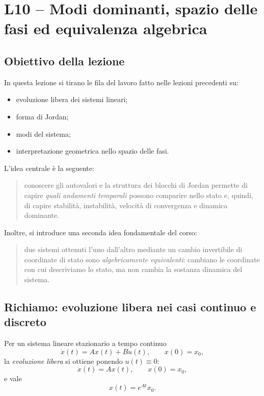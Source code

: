 \chapter{L10 -- Modi dominanti, spazio delle fasi ed equivalenza algebrica}

\section{Obiettivo della lezione}

In questa lezione si tirano le fila del lavoro fatto nelle lezioni precedenti su:
\begin{itemize}
    \item evoluzione libera dei sistemi lineari;
    \item forma di Jordan;
    \item modi del sistema;
    \item interpretazione geometrica nello spazio delle fasi.
\end{itemize}

L'idea centrale è la seguente:

\begin{quote}
conoscere gli autovalori e la struttura dei blocchi di Jordan permette di capire \emph{quali andamenti temporali} possono comparire nello stato e, quindi, di capire stabilità, instabilità, velocità di convergenza e dinamica dominante.
\end{quote}

Inoltre, si introduce una seconda idea fondamentale del corso:

\begin{quote}
due sistemi ottenuti l'uno dall'altro mediante un cambio invertibile di coordinate di stato sono \emph{algebricamente equivalenti}: cambiano le coordinate con cui descriviamo lo stato, ma non cambia la sostanza dinamica del sistema.
\end{quote}

\section{Richiamo: evoluzione libera nei casi continuo e discreto}

Per un sistema lineare stazionario a tempo continuo
\[
\dot x(t)=Ax(t)+Bu(t), \qquad x(0)=x_0,
\]
la \emph{evoluzione libera} si ottiene ponendo $u(t)\equiv 0$:
\[
\dot x(t)=Ax(t), \qquad x(0)=x_0,
\]
e vale
\begin{equation}
x(t)=e^{At}x_0.
\label{eq:L10_free_CT}
\end{equation}

